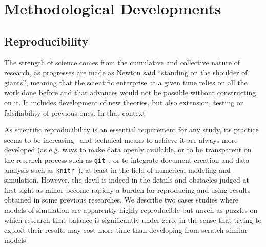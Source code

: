 



\chapter{Methodological Developments} %

\label{ch:methodology} %













\section{Reproducibility}




The strength of science comes from the cumulative and collective nature of research, as progresses are made as Newton said ``standing on the shoulder of giants'', meaning that the scientific enterprise at a given time relies on all the work done before and that advances would not be possible without constructing on it. It includes development of new theories, but also extension, testing or falsifiability of previous ones. In that context 





As scientific reproducibility is an essential requirement for any study, its practice seems to be increasing~\cite{stodden2010scientific} and technical means to achieve it are always more developed (as e.g. ways to make data openly available, or to be transparent on the research process such as \texttt{git}~\cite{ram2013git}, or to integrate document creation and data analysis such as \texttt{knitr}~\cite{xie2013knitr}), at least in the field of numerical modeling and simulation. However, the devil is indeed in the details and obstacles judged at first sight as minor become rapidly a burden for reproducing and using results obtained in some previous researches. We describe two cases studies where models of simulation are apparently highly reproducible but unveil as puzzles on which research-time balance is significantly under zero, in the sense that trying to exploit their results may cost more time than developing from scratch similar models.






